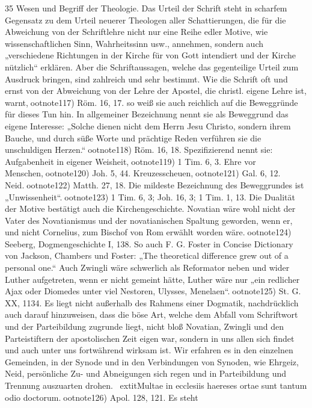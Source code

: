 35 Wesen und Begriff der Theologie. Das Urteil der Schrift steht in scharfem Gegensatz zu dem Urteil neuerer Theologen aller Schattierungen, die für die Abweichung von der Schriftlehre nicht nur eine Reihe edler Motive, wie wissenschaftlichen Sinn, Wahrheitssinn usw., annehmen, sondern auch „verschiedene Richtungen in der Kirche für von Gott intendiert und der Kirche nützlich“ erklären. Aber die Schriftaussagen, welche das gegenteilige Urteil zum Ausdruck bringen, sind zahlreich und sehr bestimmt. Wie die Schrift oft und ernst von der Abweichung von der Lehre der Apostel, die christl. eigene Lehre ist, warnt,ootnote{117) Röm. 16, 17.} so weiß sie auch reichlich auf die Beweggründe für dieses Tun hin. In allgemeiner Bezeichnung nennt sie als Beweggrund das eigene Interesse: „Solche dienen nicht dem Herrn Jesu Christo, sondern ihrem Bauche, und durch süße Worte und prächtige Reden verführen sie die unschuldigen Herzen.“ootnote{118) Röm. 16, 18.} Spezifizierend nennt sie: Aufgabenheit in eigener Weisheit,ootnote{119) 1 Tim. 6, 3.} Ehre vor Menschen,ootnote{120) Joh. 5, 44.} Kreuzesscheuen,ootnote{121) Gal. 6, 12.} Neid.ootnote{122) Matth. 27, 18.} Die mildeste Bezeichnung des Beweggrundes ist „Unwissenheit“.ootnote{123) 1 Tim. 6, 3; Joh. 16, 3; 1 Tim. 1, 13.} Die Dualität der Motive bestätigt auch die Kirchengeschichte. Novatian wäre wohl nicht der Vater des Novatianismus und der novatianischen Spaltung geworden, wenn er, und nicht Cornelius, zum Bischof von Rom erwählt worden wäre.ootnote{124) Seeberg, Dogmengeschichte I, 138. So auch F. G. Foster in Concise Dictionary von Jackson, Chambers und Foster: „The theoretical difference grew out of a personal one.“} Auch Zwingli wäre schwerlich als Reformator neben und wider Luther aufgetreten, wenn er nicht gemeint hätte, Luther wäre nur „ein redlicher Ajax oder Diomedes unter viel Nestoren, Ulysses, Menelaen“.ootnote{125) St. G. XX, 1134.} Es liegt nicht außerhalb des Rahmens einer Dogmatik, nachdrücklich auch darauf hinzuweisen, dass die böse Art, welche dem Abfall vom Schriftwort und der Parteibildung zugrunde liegt, nicht bloß Novatian, Zwingli und den Parteistiftern der apostolischen Zeit eigen war, sondern in uns allen sich findet und auch unter uns fortwährend wirksam ist. Wir erfahren es in den einzelnen Gemeinden, in der Synode und in den Verbindungen von Synoden, wie Ehrgeiz, Neid, persönliche Zu- und Abneigungen sich regen und in Parteibildung und Trennung auszuarten drohen. \ 	extit{Multae in ecclesiis haereses ortae sunt tantum odio doctorum.}ootnote{126) Apol. 128, 121.} Es steht